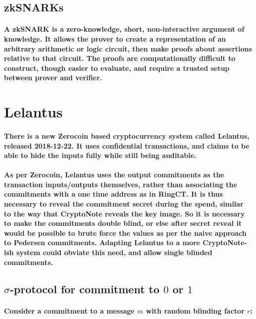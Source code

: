 \documentclass{article}
\begin{document}
\subsection{zkSNARKs}

\paragraph{A zkSNARK is a zero-knowledge, short, non-interactive argument of knowledge.  It allows the prover to create a representation of an arbitrary arithmetic or logic circuit, then make proofs about assertions relative to that circuit.  The proofs are computationally difficult to construct, though easier to evaluate, and require a trusted setup between prover and verifier.}



\section{Lelantus}

\paragraph{There is a new Zerocoin based cryptocurrency system called Lelantus, released 2018-12-22.  It uses confidential transactions, and claims to be able to hide the inputs fully while still being auditable.  }

\paragraph{As per Zerocoin, Lelantus uses the output commitments as the transaction inputs/outputs themselves, rather than associating the commitments with a one time address as in RingCT.  It is thus necessary to reveal the commitment secret during the spend, similar to the way that CryptoNote reveals the key image.  So it is necessary to make the commitments double blind, or else after secret reveal it would be possible to brute force the values as per the naive approach to Pedersen commitments.  Adapting Lelantus to a more CryptoNote-ish system could obviate this need, and allow single blinded commitments.}


\subsection{$\sigma$-protocol for commitment to $0$ or $1$}

\paragraph{Consider a commitment to a message $m$ with random blinding factor $r$:}
\end{document}

